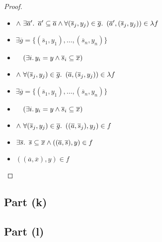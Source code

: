 \begin{prop}
\begin{proof}
\begin{itemize}
      \item[\phantom{\imps}]
        \quad$\land~\exists\overline{a}^\prime\ldotp~\overline{a}^\prime\subseteq\overline{a}\land\forall(\overline{s}_j,y_j)\in\overline{g}\ldotp~(\overline{a}^\prime,(\overline{s}_j, y_j))\in\lambda f$

      \addtolength{\itemsep}{.4\baselineskip}

      \item[\iffs]
        $\exists\overline{g} = \{(\overline{s}_1,y_1),\ldots,(\overline{s}_n,y_n)\}$

      \addtolength{\itemsep}{-.4\baselineskip}
      \item[\phantom{\imps}]
        \quad$\phantom{\land}~(\exists i\ldotp y_i=y\land\overline{s}_i\subseteq\overline{x})$

      \item[\phantom{\imps}]
        \quad$\land~\forall(\overline{s}_j,y_j)\in\overline{g}\ldotp~(\overline{a},(\overline{s}_j, y_j))\in\lambda f$

      \addtolength{\itemsep}{.4\baselineskip}

      \item[\iffs]
        $\exists\overline{g} = \{(\overline{s}_1,y_1),\ldots,(\overline{s}_n,y_n)\}$

      \addtolength{\itemsep}{-.4\baselineskip}
      \item[\phantom{\imps}]
        \quad$\phantom{\land}~(\exists i\ldotp y_i=y\land\overline{s}_i\subseteq\overline{x})$

      \item[\phantom{\imps}]
        \quad$\land~\forall(\overline{s}_j,y_j)\in\overline{g}\ldotp~((\overline{a},\overline{s}_j), y_j)\in f$

      \addtolength{\itemsep}{.4\baselineskip}

      \item[\iffs]
        $\exists\overline{s}\ldotp~\overline{s}\subseteq\overline{x}\land((\overline{a},\overline{s}),y)\in f$

      \item[\iffs]
        $((\overline{a},\overline{x}),y)\in f$
    \end{itemize}
  \end{proof}
\end{prop}

\subsection{Part (k)}\label{sec:q-2-k}
\subsection{Part (l)}\label{sec:q-2-l}

